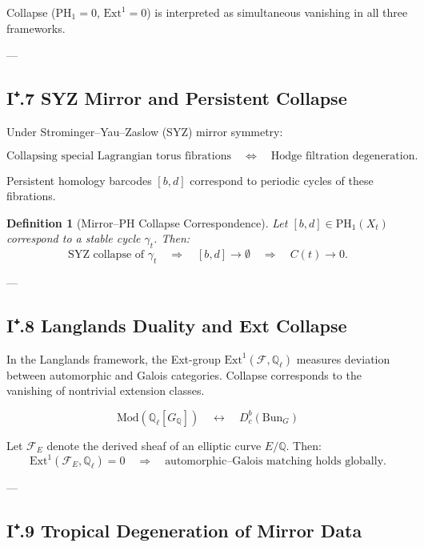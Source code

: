 \documentclass[11pt]{article}
\newtheorem{definition}[theorem]{Definition}
\begin{document}
Collapse ($\mathrm{PH}_1 = 0$, $\mathrm{Ext}^1 = 0$) is interpreted as simultaneous vanishing in all three frameworks.

---

\subsection*{I⁺.7 SYZ Mirror and Persistent Collapse}

Under Strominger–Yau–Zaslow (SYZ) mirror symmetry:

\[
\text{Collapsing special Lagrangian torus fibrations} 
\quad \Longleftrightarrow \quad 
\text{Hodge filtration degeneration}.
\]

Persistent homology barcodes $[b,d]$ correspond to periodic cycles of these fibrations.

\begin{definition}[Mirror–PH Collapse Correspondence]
Let $[b,d] \in \mathrm{PH}_1(X_t)$ correspond to a stable cycle $\gamma_t$.
Then:
\[
\text{SYZ collapse of } \gamma_t 
\quad \Rightarrow \quad 
[b,d] \to \emptyset \quad \Rightarrow \quad C(t) \to 0.
\]
\end{definition}

---

\subsection*{I⁺.8 Langlands Duality and Ext Collapse}

In the Langlands framework, the Ext-group $\mathrm{Ext}^1(\mathcal{F}, \mathbb{Q}_\ell)$ measures deviation between automorphic and Galois categories.  
Collapse corresponds to the vanishing of nontrivial extension classes.

\[
\text{Mod}(\mathbb{Q}_\ell[G_\mathbb{Q}]) \quad \longleftrightarrow \quad D^b_c(\mathrm{Bun}_G)
\]

\begin{proposition}
Let $\mathcal{F}_E$ denote the derived sheaf of an elliptic curve $E/\mathbb{Q}$.  
Then:
\[
\mathrm{Ext}^1(\mathcal{F}_E, \mathbb{Q}_\ell) = 0 
\quad \Longrightarrow \quad 
\text{automorphic–Galois matching holds globally}.
\]
\end{proposition}

---

\subsection*{I⁺.9 Tropical Degeneration of Mirror Data}
\end{document}
